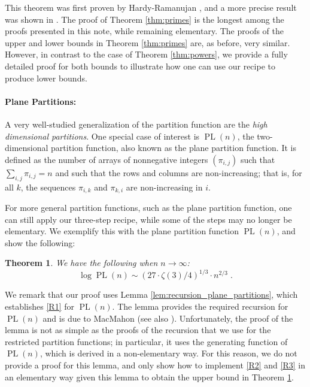 \documentclass[11pt]{article}
\DeclareMathOperator{\PL}{PL}
\theoremstyle{plain}
\newtheorem{theorem}{Theorem}[section]
\begin{document}
This theorem was first proven by Hardy-Ramanujan \cite{HR1}, and a more precise result was shown in \cite{Vau2008}.
The proof of Theorem \ref{thm:primes} is the longest among the proofs presented in this note, while remaining elementary. The proofs of the upper and lower bounds in Theorem \ref{thm:primes} are, as before, very similar. However, in contrast to the case of Theorem \ref{thm:powers}, we provide a fully detailed proof for both bounds to illustrate how one can use our recipe to produce lower bounds.




\paragraph{Plane Partitions:}
A very well-studied generalization of the partition function are the \emph{high dimensional partitions}. One special case of interest is $\PL(n)$, the two-dimensional partition function, also known as the plane partition function.
It is defined as the number of arrays of nonnegative integers $(\pi_{i,j})$ such that $\sum_{i,j}\pi_{i,j}=n$ and such that the rows and columns are non-increasing; that is, for all $k$, the sequences $\pi_{i,k}$ and $\pi_{k,i}$ are non-increasing in $i$.

For more general partition functions, such as the plane partition function, one can still apply our three-step recipe, while some of the steps may no longer be elementary. We exemplify this with the plane partition function $\PL(n)$, and show the following:
\begin{theorem}\label{thm:plane_partitions}
We have the following when $n\to \infty$:
$$
\log \PL(n) \sim \left(27\cdot \zeta(3)/4\right)^{1/3} \cdot n^{2/3}\;.
$$
\end{theorem}
We remark that our proof uses Lemma \ref{lem:recursion_plane_partitions}, which establishes \ref{R1} for $\PL(n)$. The lemma provides the required recursion for $\PL(n)$ and is due to MacMahon \cite{Mac1,Mac2,Mac3} (see also \cite{HeiNeuTro2023}). Unfortunately, the proof of the lemma is not as simple as the proofs of the recursion that we use for the restricted partition functions; in particular, it uses the generating function of $\PL(n)$, which is derived in a non-elementary way. For this reason, we do not provide a proof for this lemma, and only show how to implement \ref{R2} and \ref{R3} in an elementary way given this lemma to obtain the upper bound in Theorem \ref{thm:plane_partitions}.
\end{document}
